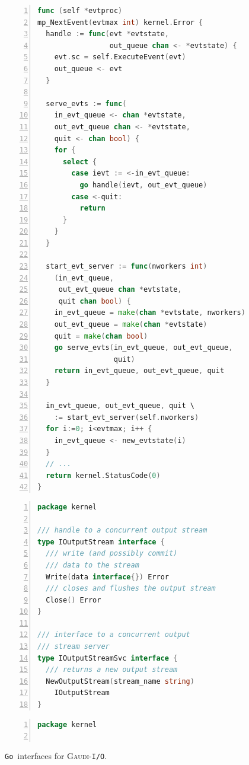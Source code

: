 \documentclass[a4paper]{jpconf}
\newcommand{\gaudi}{\textsc{Gaudi}}
\newcommand{\golang}{\texttt{Go}}
\begin{document}
\begin{figure}[h]
\begin{center}
  \begin{minipage}{18pc}
\begin{lstlisting}[language=Go,
    basicstyle=\tiny,
    frame=trbl,
    numbers=left,
    showstringspaces=false,
    stringstyle=\ttfamily]
func (self *evtproc) 
mp_NextEvent(evtmax int) kernel.Error {
  handle := func(evt *evtstate, 
                 out_queue chan <- *evtstate) {
    evt.sc = self.ExecuteEvent(evt)
    out_queue <- evt
  }

  serve_evts := func(
    in_evt_queue <- chan *evtstate, 
    out_evt_queue chan <- *evtstate, 
    quit <- chan bool) {
    for {
      select {
        case ievt := <-in_evt_queue:
          go handle(ievt, out_evt_queue)
        case <-quit:
          return
      }
    }
  }

  start_evt_server := func(nworkers int) 
    (in_evt_queue,
     out_evt_queue chan *evtstate,
     quit chan bool) {
    in_evt_queue = make(chan *evtstate, nworkers)
    out_evt_queue = make(chan *evtstate)
    quit = make(chan bool)
    go serve_evts(in_evt_queue, out_evt_queue, 
                  quit)
    return in_evt_queue, out_evt_queue, quit
  }

  in_evt_queue, out_evt_queue, quit \
    := start_evt_server(self.nworkers)
  for i:=0; i<evtmax; i++ {
    in_evt_queue <- new_evtstate(i)
  }
  // ...
  return kernel.StatusCode(0)
}
\end{lstlisting}
    \caption{\label{fig-evt-proc-code}\golang\ code realizing the
      parallelization of the event loop.}
\begin{lstlisting}[language=Go,
    basicstyle=\tiny,
    frame=trbl,
    numbers=left,
    showstringspaces=false,
    stringstyle=\ttfamily]
package kernel

/// handle to a concurrent output stream
type IOutputStream interface {
  /// write (and possibly commit) 
  /// data to the stream
  Write(data interface{}) Error
  /// closes and flushes the output stream
  Close() Error
}

/// interface to a concurrent output 
/// stream server
type IOutputStreamSvc interface {
  /// returns a new output stream
  NewOutputStream(stream_name string)
    IOutputStream
}
\end{lstlisting}
    \caption{\label{fig-iout-go}\golang\ interfaces for \gaudi-\texttt{I/O}.}
  \end{minipage}\hspace{3pc}%
  \begin{minipage}{15pc}
\begin{lstlisting}[language=Go,
    basicstyle=\tiny,
    frame=trbl,
    numbers=left,
    showstringspaces=false,
    stringstyle=\ttfamily]
package kernel


\end{lstlisting}
\end{minipage}
\end{center}
\end{figure}
\end{document}
